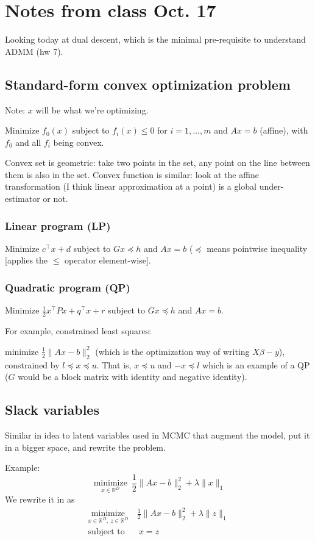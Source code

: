 \documentclass{article}
\begin{document}
\section{Notes from class Oct. 17}
Looking today at dual descent, which is the minimal pre-requisite to understand ADMM (hw 7). 

\subsection{Standard-form convex optimization problem}
Note: $x$ will be what we're optimizing.

Minimize $f_0(x)$ subject to $f_i(x) \leq 0$ for $i=1,\ldots, m$ and $Ax=b$ (affine), with $f_0$ and all $f_i$ being convex.

Convex set is geometric: take two points in the set, any point on the line between
them is also in the set. Convex function is similar: look at the affine transformation (I think linear approximation at a point) is a global under-estimator or not.

\subsubsection{Linear program (LP)}
Minimize $c^\top x + d$ subject to $Gx\preceq h$ and $Ax=b$ ($\preceq$ means pointwise inequality [applies the $\leq$ operator element-wise].

\subsubsection{Quadratic program (QP)}
Minimize $\frac{1}{2}x^\top P x + q^\top x + r$ subject to $Gx\preceq h$ and $Ax=b$.

For example, constrained least squares:

minimize $\frac{1}{2}\lVert Ax-b\rVert_2^2$ (which is the optimization way of writing $X\beta-y$), constrained by $l\preceq x \preceq u$. That is, $x\preceq u$ and $-x\preceq l$ which is an example of a QP ($G$ would be a block matrix with identity and negative identity).

\subsection{Slack variables}
Similar in idea to latent variables used in MCMC that augment the model, put it
in a bigger space, and rewrite the problem.

Example: $$\underset{x\in \mathbb{R}^D}{\operatorname{minimize}}~\frac{1}{2}\lVert Ax-b\rVert_2^2 + \lambda \lVert x\rVert_1$$
We rewrite it in as
\begin{align*}
\underset{x\in \mathbb{R}^D,~z\in\mathbb{R}^D}{\operatorname{minimize}}~&\frac{1}{2}\lVert Ax-b\rVert_2^2 + \lambda \lVert z\rVert_1\\
\textrm{subject to}&~x=z
\end{align*}
\end{document}
